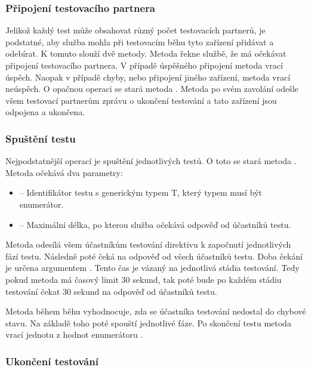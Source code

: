 \subsubsection{Připojení testovacího partnera}

Jelikož každý test může obsahovat různý počet testovacích partnerů, je podstatné, aby služba mohla při testovacím běhu tyto zařízení přidávat a odebírat. K tomuto slouží dvě metody. Metoda  řekne službě, že má očekávat připojení testovacího partnera. V případě úspěšného připojení metoda vrací úspěch. Naopak v případě chyby, nebo připojení jiného zařízení, metoda vrací neúspěch. O opačnou operaci se stará metoda . Metoda po svém zavolání odešle všem testovací partnerům zprávu o ukončení testování a tato zařízení jsou odpojena a ukončena.

\subsubsection{Spuštění testu}

Nejpodstatnější operací je spuštění jednotlivých testů. O toto se stará metoda . Metoda očekává dva parametry:

\begin{itemize}
    \item {} -- Identifikátor testu s generickým typem T, který typem musí být enumerátor.
    \item {} -- Maximální délka, po kterou služba očekává odpověď od účastníků testu. 
\end{itemize}

Metoda odesílá všem účastníkům testování direktivu k započnutí jednotlivých fází testu. Následně poté čeká na odpověď od všech účastníků testu. Doba čekání je určena argumentem . Tento čas je vázaný na jednotlivá stádia testování. Tedy pokud metoda má časový limit 30 sekund, tak poté bude po každém stádiu testování čekat 30 sekund na odpověď od účastníků testu.

Metoda během běhu vyhodnocuje, zda se účastníka testování nedostal do chybové stavu. Na základě toho poté spouští jednotlivé fáze. Po skončení testu metoda vrací jednotu z hodnot enumerátoru . 

\subsubsection{Ukončení testování}

